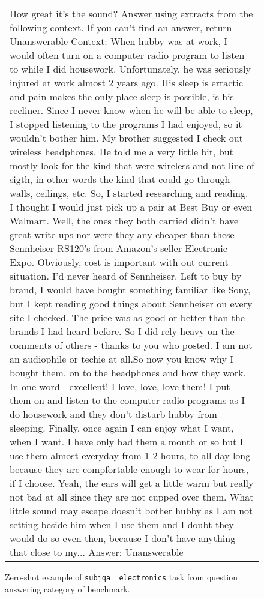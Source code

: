 \begin{figure}[h]
\centering
\begin{tabular}{p{}}
\cellcolor{oldlace} How great it's the sound?\vspace{1pt} \newline \vspace{1pt} \newline Answer using extracts from the following context. If you can't find an answer, return Unanswerable\vspace{1pt} \newline \vspace{1pt} \newline Context:\vspace{1pt} \newline When hubby was at work, I would often turn on a computer radio program to listen to while I did housework. Unfortunately, he was seriously injured at work almost 2 years ago. His sleep is erractic and pain makes the only place sleep is possible, is his recliner. Since I never know when he will be able to sleep, I stopped listening to the programs I had enjoyed, so it wouldn't bother him. My brother suggested I check out wireless headphones. He told me a very little bit, but mostly look for the kind that were wireless and not line of sigth, in other words the kind that could go through walls, ceilings, etc. So, I started researching and reading. I thought I would just pick up a pair at Best Buy or even Walmart. Well, the ones they both carried didn't have great write ups nor were they any cheaper than these Sennheiser RS120's from Amazon's seller Electronic Expo. Obviously, cost is important with out current situation. I'd never heard of Sennheiser. Left to buy by brand, I would have bought something familiar like Sony, but I kept reading good things about Sennheiser on every site I checked. The price was as good or better than the brands I had heard before. So I did rely heavy on the comments of others - thanks to you who posted. I am not an audiophile or techie at all.So now you know why I bought them, on to the headphones and how they work. In one word - excellent! I love, love, love them! I put them on and listen to the computer radio programs as I do housework and they don't disturb hubby from sleeping. Finally, once again I can enjoy what I want, when I want. I have only had them a month or so but I use them almost everyday from 1-2 hours, to all day long because they are compfortable enough to wear for hours, if I choose. Yeah, the ears will get a little warm but really not bad at all since they are not cupped over them. What little sound may escape doesn't bother hubby as I am not setting beside him when I use them and I doubt they would do so even then, because I don't have anything that close to my...\vspace{1pt} \newline Answer: \textcolor{cadmiumgreen}{Unanswerable} \\
\end{tabular}
\caption{Zero-shot example of \texttt{subjqa\_\_electronics} task from question answering category of \promptsource benchmark.}
\end{figure}




